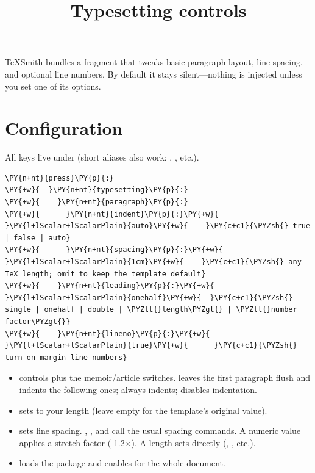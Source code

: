 \documentclass[a4paper,twoside]{article}
\title{Typesetting controls}
\author{}\date{}
\begin{document}
\maketitle
TeXSmith bundles a  fragment that tweaks basic paragraph layout, line spacing, and optional line numbers. By default it stays silent---nothing is injected unless you set one of its options.
\section{Configuration}
All keys live under  (short aliases also work: , , etc.).
\begin{tscode}[lang=yaml, engine=pygments]
\begin{Verbatim}[commandchars=\\\{\},breaklines, breakanywhere, commandchars=\\\{\}]
\PY{n+nt}{press}\PY{p}{:}
\PY{+w}{  }\PY{n+nt}{typesetting}\PY{p}{:}
\PY{+w}{    }\PY{n+nt}{paragraph}\PY{p}{:}
\PY{+w}{      }\PY{n+nt}{indent}\PY{p}{:}\PY{+w}{ }\PY{l+lScalar+lScalarPlain}{auto}\PY{+w}{    }\PY{c+c1}{\PYZsh{} true | false | auto}
\PY{+w}{      }\PY{n+nt}{spacing}\PY{p}{:}\PY{+w}{ }\PY{l+lScalar+lScalarPlain}{1cm}\PY{+w}{    }\PY{c+c1}{\PYZsh{} any TeX length; omit to keep the template default}
\PY{+w}{    }\PY{n+nt}{leading}\PY{p}{:}\PY{+w}{ }\PY{l+lScalar+lScalarPlain}{onehalf}\PY{+w}{  }\PY{c+c1}{\PYZsh{} single | onehalf | double | \PYZlt{}length\PYZgt{} | \PYZlt{}number factor\PYZgt{}}
\PY{+w}{    }\PY{n+nt}{lineno}\PY{p}{:}\PY{+w}{ }\PY{l+lScalar+lScalarPlain}{true}\PY{+w}{      }\PY{c+c1}{\PYZsh{} turn on margin line numbers}
\end{Verbatim}
\end{tscode}
\begin{itemize}
\item {} controls  plus the memoir/article  switches.  leaves the first paragraph flush and indents the following ones;  always indents;  disables indentation.
\item {} sets  to your length (leave empty for the template's original value).
\item {} sets line spacing. , , and  call the usual spacing commands. A numeric value applies a stretch factor ( 1.2\(\times\)). A length sets  directly (\tscodeinline{1em}, \tscodeinline{14pt}, etc.).
\item {} loads the  package and enables  for the whole document.
\end{itemize}
\end{document}
